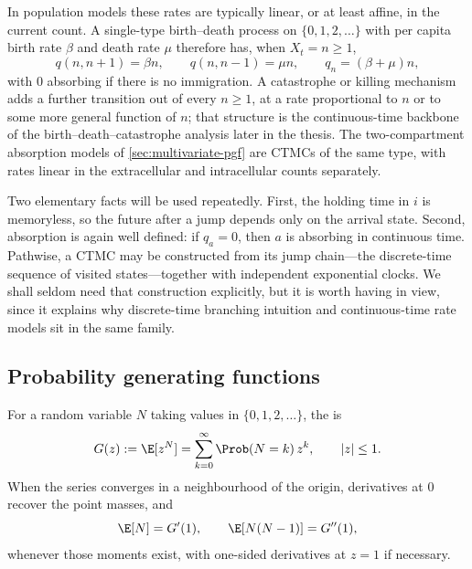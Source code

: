 In population models these rates are typically linear, or at least affine, in the current count.  A single-type birth--death process on $\{0,1,2,\ldots\}$ with per capita birth rate $\beta$ and death rate $\mu$ therefore has, when $X_t=n\ge1$,
\begin{equation}
  q(n,n+1)=\beta n,
  \qquad
  q(n,n-1)=\mu n,
  \qquad
  q_n=(\beta+\mu)n,
  \label{eq:bd-rates}
\end{equation}
with $0$ absorbing if there is no immigration.  A catastrophe or killing mechanism adds a further transition out of every $n\ge1$, at a rate proportional to $n$ or to some more general function of $n$; that structure is the continuous-time backbone of the birth--death--catastrophe analysis later in the thesis.  The two-compartment absorption models of \cref{sec:multivariate-pgf} are CTMCs of the same type, with rates linear in the extracellular and intracellular counts separately.

Two elementary facts will be used repeatedly.  First, the holding time in $i$ is memoryless, so the future after a jump depends only on the arrival state.  Second, absorption is again well defined: if $q_a=0$, then $a$ is absorbing in continuous time.  Pathwise, a CTMC may be constructed from its jump chain---the discrete-time sequence of visited states---together with independent exponential clocks.  We shall seldom need that construction explicitly, but it is worth having in view, since it explains why discrete-time branching intuition and continuous-time rate models sit in the same family.

\subsection{Probability generating functions}
\label{sec:pgf-basics}

For a random variable $N$ taking values in $\{0,1,2,\ldots\}$, the \pgf{} is
\begin{equation}
  G(z)
  :=\E[z^N]
  =\sum_{k=0}^{\infty}\Prob(N=k)\,z^k,
  \qquad |z|\le1.
  \label{eq:univariate-pgf}
\end{equation}
When the series converges in a neighbourhood of the origin, derivatives at $0$ recover the point masses, and
\begin{equation}
  \E[N]=G'(1),
  \qquad
  \E[N(N-1)]=G''(1),
  \label{eq:pgf-moments}
\end{equation}
whenever those moments exist, with one-sided derivatives at $z=1$ if necessary.

